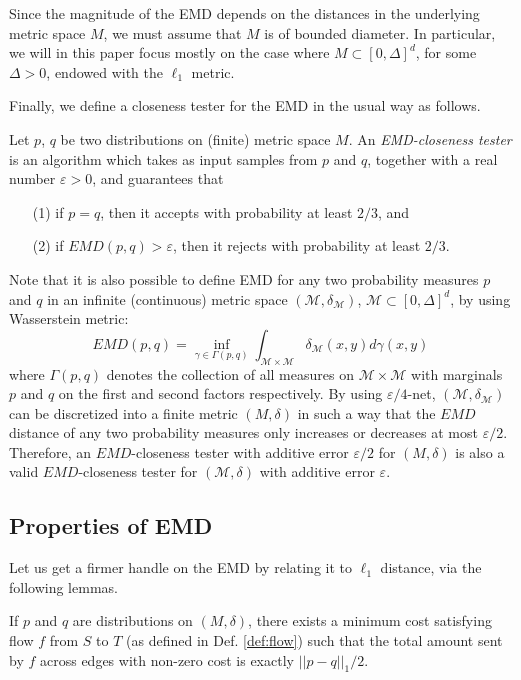 \documentclass[11pt]{article}
\newcommand{\eps}{\varepsilon}
\begin{document}
Since the magnitude of the EMD depends on the distances in the underlying metric
space $M$, we must assume that $M$ is of bounded diameter. In particular, we will in
this paper focus mostly on the case where $M \subset [0,\Delta]^d$, for some $\Delta > 0$,
endowed with the $\ell_1$ metric.

Finally, we define a closeness tester for the EMD in the usual way as follows.

\begin{definition}
  Let $p$, $q$ be two distributions on (finite) metric space $M$. An
  {\em EMD-closeness tester} is an algorithm which takes as input samples from $p$ and $q$,
  together with a real number $\eps>0$, and guarantees that
  \begin{itemize}
    \item[(1)] if $p = q$, then it accepts with probability at least $2/3$, and
    \item[(2)] if $EMD(p,q) > \eps$, then it rejects with probability at least $2/3$.
  \end{itemize}
\end{definition}

Note that it is also possible to define EMD for any two probability measures $p$ and $q$ in an infinite (continuous) metric space $(\mathcal{M},\delta_\mathcal{M})$, $\mathcal{M} \subset [0,\Delta]^d$, by using Wasserstein metric: $$ EMD(p,q) =  \inf_{\gamma \in \Gamma(p,q)}{\int_{\mathcal{M} \times \mathcal{M}}{\delta_\mathcal{M}(x,y)d\gamma(x,y)}}  $$  where $\Gamma(p,q)$ denotes the collection of all measures on $\mathcal{M} \times \mathcal{M}$ with marginals $p$ and $q$ on the first and second factors respectively. By using $\eps/4$-net, $(\mathcal{M},\delta_\mathcal{M})$ can be discretized into a finite metric $(M,\delta)$ in such a way that the $EMD$ distance of any two probability measures only increases or decreases at most $\eps/2$. Therefore, an $EMD$-closeness tester with additive error $\eps/2$ for $(M,\delta)$ is also a valid $EMD$-closeness tester for $(\mathcal{M},\delta)$ with additive error $\eps$.

\subsection{Properties of EMD}

Let us get a firmer handle on the EMD by relating it to $\ell_1$ distance, via the
following lemmas.

\begin{lemma}\label{lem:L1/2}
        If $p$ and $q$ are distributions on $(M,\delta)$, there exists a minimum cost
        satisfying flow $f$ from $S$ to $T$ (as defined in Def. \ref{def:flow}) such that the total
        amount sent by $f$ across edges with non-zero cost is exactly $||p-q||_1/2$.
\end{lemma}
\end{document}
